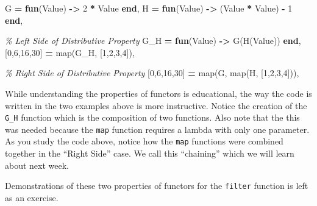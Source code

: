 \documentclass[
]{book}
\newenvironment{Shaded}{\begin{snugshade}}{\end{snugshade}}
\newcommand{\CommentTok}[1]{\textcolor[rgb]{0.56,0.35,0.01}{\textit{#1}}}
\newcommand{\DecValTok}[1]{\textcolor[rgb]{0.00,0.00,0.81}{#1}}
\newcommand{\FunctionTok}[1]{\textcolor[rgb]{0.00,0.00,0.00}{#1}}
\newcommand{\KeywordTok}[1]{\textcolor[rgb]{0.13,0.29,0.53}{\textbf{#1}}}
\newcommand{\OperatorTok}[1]{\textcolor[rgb]{0.81,0.36,0.00}{\textbf{#1}}}
\newcommand{\VariableTok}[1]{\textcolor[rgb]{0.00,0.00,0.00}{#1}}
\begin{document}
\begin{Shaded}
\begin{Highlighting}[]
\VariableTok{G} \OperatorTok{=} \KeywordTok{fun}\FunctionTok{(}\VariableTok{Value}\FunctionTok{)} \OperatorTok{{-}\textgreater{}} \DecValTok{2} \OperatorTok{*} \VariableTok{Value} \KeywordTok{end}\FunctionTok{,}
\VariableTok{H} \OperatorTok{=} \KeywordTok{fun}\FunctionTok{(}\VariableTok{Value}\FunctionTok{)} \OperatorTok{{-}\textgreater{}} \FunctionTok{(}\VariableTok{Value} \OperatorTok{*} \VariableTok{Value}\FunctionTok{)} \OperatorTok{{-}} \DecValTok{1} \KeywordTok{end}\FunctionTok{,}

\CommentTok{\% Left Side of Distributive Property}
\VariableTok{G\_H} \OperatorTok{=} \KeywordTok{fun}\FunctionTok{(}\VariableTok{Value}\FunctionTok{)} \OperatorTok{{-}\textgreater{}} \VariableTok{G}\FunctionTok{(}\VariableTok{H}\FunctionTok{(}\VariableTok{Value}\FunctionTok{))} \KeywordTok{end}\FunctionTok{,}
\FunctionTok{[}\DecValTok{0}\FunctionTok{,}\DecValTok{6}\FunctionTok{,}\DecValTok{16}\FunctionTok{,}\DecValTok{30}\FunctionTok{]} \OperatorTok{=} \FunctionTok{map(}\VariableTok{G\_H}\FunctionTok{,} \FunctionTok{[}\DecValTok{1}\FunctionTok{,}\DecValTok{2}\FunctionTok{,}\DecValTok{3}\FunctionTok{,}\DecValTok{4}\FunctionTok{]),}

\CommentTok{\% Right Side of Distributive Property}
\FunctionTok{[}\DecValTok{0}\FunctionTok{,}\DecValTok{6}\FunctionTok{,}\DecValTok{16}\FunctionTok{,}\DecValTok{30}\FunctionTok{]} \OperatorTok{=} \FunctionTok{map(}\VariableTok{G}\FunctionTok{,} \FunctionTok{map(}\VariableTok{H}\FunctionTok{,} \FunctionTok{[}\DecValTok{1}\FunctionTok{,}\DecValTok{2}\FunctionTok{,}\DecValTok{3}\FunctionTok{,}\DecValTok{4}\FunctionTok{])),}
\end{Highlighting}
\end{Shaded}

While understanding the properties of functors is educational, the way the code is written in the two examples above is more instructive. Notice the creation of the \texttt{G\_H} function which is the composition of two functions. Also note that the this was needed because the \texttt{map} function requires a lambda with only one parameter. As you study the code above, notice how the \texttt{map} functions were combined together in the ``Right Side'' case. We call this ``chaining'' which we will learn about next week.

Demonstrations of these two properties of functors for the \texttt{filter} function is left as an exercise.
\end{document}
